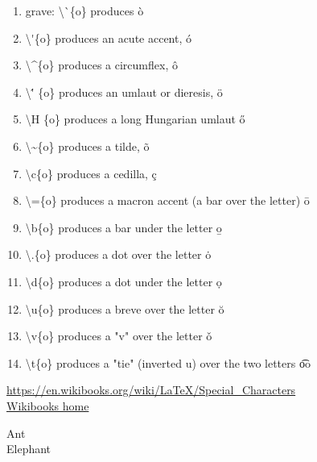 \documentclass{article}
\begin{document}
\begin{enumerate}  
	\item grave: \textbackslash\`{}\{o\}  produces \`{o} 
	\item \textbackslash\'{}\{o\} produces an acute accent,     \'{o} 
	\item \textbackslash\^{}\{o\} produces a circumflex,     \^{o} 

	\item \textbackslash \''{} \{o\} produces an umlaut or dieresis,   \"{o} 
	
	
	\item \textbackslash H \{o\} produces a long Hungarian umlaut    \H{o} 
		
		
	\item \textbackslash\~{}\{o\} produces a tilde,     \~{o} 
			
			
	\item \textbackslash c\{o\} produces a cedilla,     \c{c} 
				
				
	\item \textbackslash=\{o\}  produces a macron accent (a bar over the letter)    \={o}
					
					
	\item \textbackslash b\{o\} produces a bar under the letter    \b{o} 
						
						
	\item \textbackslash .\{o\} produces a dot over the letter    \.{o}
	
	
	\item \textbackslash d\{o\} produces a dot under the letter     \d{o} 
	
	\item \textbackslash u\{o\} produces a breve over the letter    \u{o} 
	
	\item \textbackslash v\{o\} produces a "v" over the letter    \v{o} 
	
	\item \textbackslash t\{o\} produces a "tie" (inverted u) over the two letters    \t{oo} 
	

\end{enumerate}

\url{https://en.wikibooks.org/wiki/LaTeX/Special_Characters}\\
\href{https://en.wikibooks.org/wiki/LaTeX/Special_Characters}{Wikibooks home}

\begin{description}
\item [Ant] \blindtext
\item [Elephant] \blindtext
\end{description}
\end{document}
